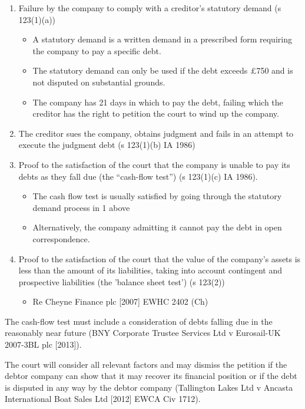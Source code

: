 \documentclass[
]{article}
\providecommand{\tightlist}{%
  \setlength{\itemsep}{0pt}\setlength{\parskip}{0pt}}
\begin{document}
\begin{enumerate}
\tightlist
\item
  Failure by the company to comply with a creditor's statutory demand (s
  123(1)(a))

  \begin{itemize}
  \tightlist
  \item
    A statutory demand is a written demand in a prescribed form
    requiring the company to pay a specific debt.
  \item
    The statutory demand can only be used if the debt exceeds £750 and
    is not disputed on substantial grounds.
  \item
    The company has 21 days in which to pay the debt, failing which the
    creditor has the right to petition the court to wind up the company.
  \end{itemize}
\item
  The creditor sues the company, obtains judgment and fails in an
  attempt to execute the judgment debt (s 123(1)(b) IA 1986)
\item
  Proof to the satisfaction of the court that the company is unable to
  pay its debts as they fall due (the ``cash-flow test'') (s 123(1)(c)
  IA 1986).

  \begin{itemize}
  \tightlist
  \item
    The cash flow test is usually satisfied by going through the
    statutory demand process in 1 above
  \item
    Alternatively, the company admitting it cannot pay the debt in open
    correspondence.
  \end{itemize}
\item
  Proof to the satisfaction of the court that the value of the company's
  assets is less than the amount of its liabilities, taking into account
  contingent and prospective liabilities (the 'balance sheet test') (s
  123(2))

  \begin{itemize}
  \tightlist
  \item
    Re Cheyne Finance plc {[}2007{]} EWHC 2402 (Ch)
  \end{itemize}
\end{enumerate}

The cash-flow test must include a consideration of debts falling due in
the reasonably near future (BNY Corporate Trustee Services Ltd v
Eurosail-UK 2007-3BL plc {[}2013{]}).

The court will consider all relevant factors and may dismiss the
petition if the debtor company can show that it may recover its
financial position or if the debt is disputed in any way by the debtor
company (Tallington Lakes Ltd v Ancasta International Boat Sales Ltd
{[}2012{]} EWCA Civ 1712).
\end{document}
